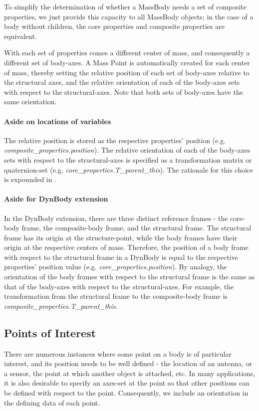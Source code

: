 To simplify the determination of whether a MassBody needs a set of composite 
properties, we just provide this capacity to all MassBody objects; in the case 
of a body without children, the core properties and composite properties are 
equivalent.

With each set of properties comes a different center of mass, and consequently 
a different set of body-axes.  A Mass Point is automatically created for each 
center of mass, thereby setting 
the relative position of each set of body-axes relative to the structural 
axes, and the relative orientation of each of 
the body-axes sets with respect to the structural-axes.  Note that both sets 
of body-axes have the same orientation.

 \paragraph{Aside on locations of variables}
The relative position is stored as the respective properties' position (e.g. 
\textit{composite\_properties.position}). The relative orientation of each of 
the body-axes sets with respect to the structural-axes is specified as a 
transformation matrix or quaternion-set (e.g. 
\textit{core\_properties.T\_parent\_this}).  The rationale for this choice is 
expounded in .

\paragraph{Aside for DynBody extension}

In the DynBody extension, there are three distinct reference frames - the 
core-body frame, the composite-body frame, and the structural frame.  The 
structural frame has its origin at the structure-point, while the body frames 
have their origin at the respective centers of mass.  Therefore, the position 
of a body frame with respect to the structural frame in a DynBody is equal to 
the respective properties' position value (e.g. 
\textit{core\_properties.position}).  By analogy, the orientation of the body 
frames with respect to the structural frame is the same as that of the 
body-axes with respect to the structural-axes. For example, the transformation 
from the structural frame to the composite-body frame is 
\textit{composite\_properties.T\_parent\_this}.

\subsection{Points of Interest}\label{sec:MassPoint}
There are numerous instances where some point on a body is of particular 
interest, and its position needs to be well defined - the location of an 
antenna, or a sensor, the point at which another object is attached, etc.  In 
many applications, it is also desirable to specify an axes-set at the point so 
that other positions can be defined with respect to the point.  Consequently, 
we include an orientation in the defining data of each point.

